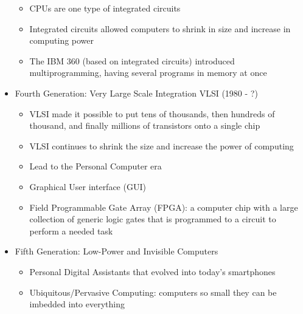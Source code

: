 \documentclass[12pt]{article}
\begin{document}
\begin{itemize}
\begin{itemize}
\item CPUs are one type of integrated circuits 
\item Integrated circuits allowed computers to shrink in size and increase in computing power 
\item The IBM 360 (based on integrated circuits) introduced multiprogramming, having several programs in memory at once \end{itemize} 
\item Fourth Generation: Very Large Scale Integration VLSI (1980 - ?) \begin{itemize}
\item VLSI made it possible to put tens of thousands, then hundreds of thousand, and finally millions of transistors onto a single chip
\item VLSI continues to shrink the size and increase the power of computing
\item Lead to the Personal Computer era 
\item Graphical User interface (GUI) 
\item Field Programmable Gate Array (FPGA): a computer chip with a large collection of generic logic gates that is programmed to a circuit to perform a needed task \end{itemize} 
\item Fifth Generation: Low-Power and Invisible Computers \begin{itemize} 
\item Personal Digital Assistants that evolved into today's smartphones 
\item Ubiquitous/Pervasive Computing: computers so small they can be imbedded into everything \end{itemize} \end{itemize}
\end{document}
